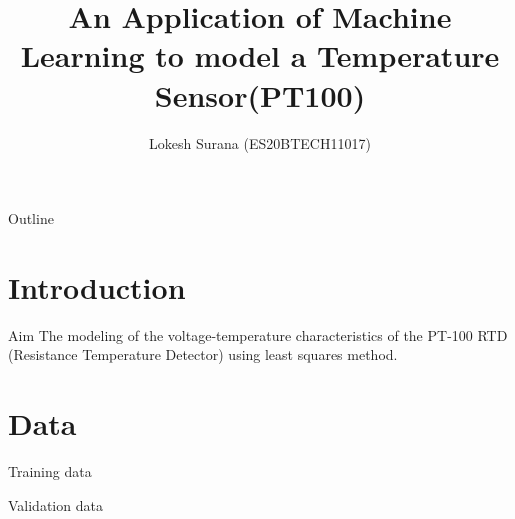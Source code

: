 \documentclass{beamer}
\title[PT-100 ]{An Application of Machine Learning to model a Temperature Sensor(PT100)}
\author{Lokesh Surana (ES20BTECH11017)}
\begin{document}
\begin{frame}
    \titlepage
\end{frame}

\begin{frame}{Outline}
    \tableofcontents
\end{frame}

\section{Introduction}
\begin{frame}{Aim}
    The modeling of the voltage-temperature characteristics of the PT-100 RTD (Resistance Temperature Detector) using least squares method.
\end{frame}

\section{Data}
\begin{frame}{Training data}
    \begin{table}[ht!]
        
        \caption{Training data}
        \label{tab:Training data}
    \end{table}
\end{frame}

\begin{frame}{Validation data}
    \begin{table}[!ht]
        \centering
        
        \caption{Validation data}
        \label{tab:Validation data}
    \end{table}
\end{frame}
\end{document}
